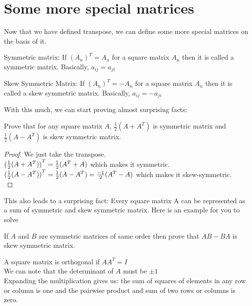 \section{Some more special matrices}
Now that we have defined transpose, we can define some more special matrices on the basis of it.\\
\begin{definition}
    Symmetric matrix: If ${(A_n)}^T=A_n$  for a square matrix $A_n$ then it is called a symmetric matrix. Basically, $a_{ij}=a_{ji}$
\end{definition}
\begin{definition}
    Skew Symmetric Matrix: If ${(A_n)}^T=-A_n$  for a square matrix $A_n$ then it is called a skew symmetric matrix. Basically, $a_{ij}=-a_{ji}$
\end{definition}
With this much, we can start proving almost surprising facts:\\
\begin{example}
    Prove that for any square matrix $A$, $\frac{1}{2}(A+A^T)$ is symmetric matrix and $\frac{1}{2}(A-A^T)$ is skew symmetric matrix.
\end{example}
\begin{proof}
    We just take the transpose.\\
    ${(\frac{1}{2}(A+A^T))}^T\\
    = \frac{1}{2}(A^T+A)$ which makes it symmetric.\\
    ${(\frac{1}{2}(A-A^T))}^T\\
    = \frac{1}{2}(A-A^T)\\
    = \frac{-1}{2}(A^T-A)$ which makes it skew-symmetric.\\
\end{proof}
This also leads to a surprising fact: Every square matrix A can be represented as a sum of symmetric and skew symmetric matrix. Here is an example for you to solve\\
\begin{example}
 If $A$ and $B$ are symmetric matrices of same order then prove that $AB- BA$ is skew symmetric matrix.
\end{example}
\begin{definition}
    A square matrix is orthogonal if $AA^T=I$\\
    We can note that the determinant of $A$ must be $\pm 1$\\
    Expanding the multiplication gives us:  the sum of squares of elements in any row or column is one and the pairwise product and sum of two rows or columns is zero.\\
\end{definition}
